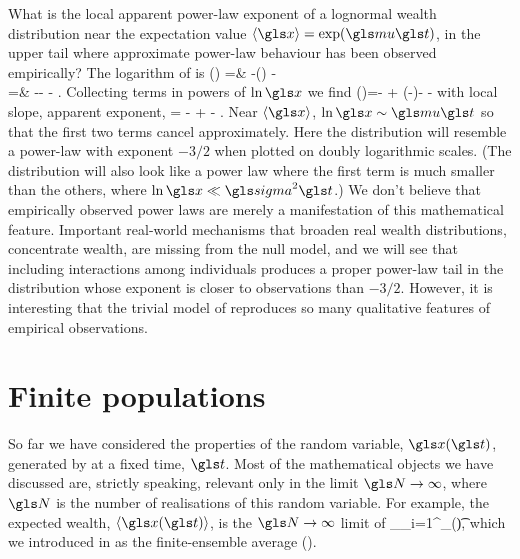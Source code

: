 What is the local apparent power-law exponent of a lognormal wealth distribution near the 
expectation value $\ave{\x}=\exp(\gmu \t)$, \ie in the upper tail where approximate power-law behaviour
has been observed empirically? The logarithm of  is
\bea
\ln \PDF(\x) =& -\ln\left(\x{}\right) -\\
=& -\ln \x - - .
\eea
Collecting terms in powers of $\ln \x$ we find
\be
\ln \PDF(\x)=-  + \left(-\right)\ln \x - -
\ee
with local slope, \ie apparent exponent,
\be
\frac{\gd\ln \PDF(\x)}{\gd \ln \x} = - \frac{\ln \x}{\gsigma^2 \t}  +  - .
\ee
Near $\ave{\x}$, $\ln \x \sim \gmu \t$ so that the first two terms cancel approximately. Here the distribution will resemble a power-law with exponent $-3/2$ when plotted on doubly logarithmic scales. (The distribution will also look like a power law where the first term is much smaller than the others, \eg where $\ln \x \ll \gsigma^2 \t$.) We don't believe that empirically observed power laws are merely a manifestation of this mathematical feature. Important real-world  mechanisms that broaden real wealth distributions, \ie concentrate wealth, are missing from the null model, and we will see that including interactions among individuals produces a proper power-law tail in the distribution whose exponent is closer to observations than $-3/2$. However, it is interesting that the trivial model of \GBM reproduces so many qualitative features of empirical observations. 


\section{Finite populations}
So far we have considered the properties of the random variable, $\x(\t)$, generated by \GBM at a fixed time, $\t$. Most of the mathematical objects we have discussed are, strictly speaking, relevant only in the limit $\N\to\infty$, where $\N$ is the number of realisations of this random variable. For example, the expected wealth, $\ave{\x(\t)}$, is the $\N\to\infty$ limit of
\be
\ave{\x(\t)}_\N \equiv {}\sum_{i=1}^\N \x_\gi(\t),
\ee
which we introduced in  as the finite-ensemble average (\FEA).

